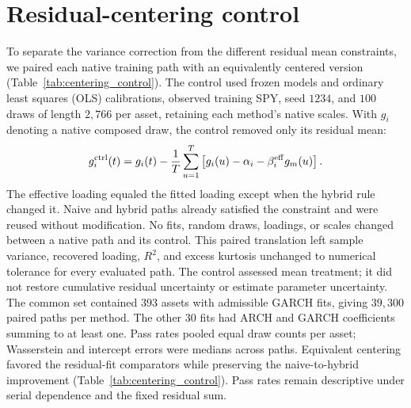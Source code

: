 \begin{table}[H]
  \centering
  \caption{\textbf{Monte Carlo uncertainty in the effect of jump settings
    under corrected composition.} Differences are relative to jumps
    disabled, with $1{,}000$ market replications per window.
    $\Delta$ACF$_{25}$ is the change in mean absolute error of the
    absolute-return autocorrelation function through lag $25$;
    negative values indicate improved temporal fit.
    $\Delta$KS is the change in Kolmogorov--Smirnov non-rejection
    rate in percentage points. Brackets contain approximate $95\%$
    Monte Carlo (MC) intervals conditional on the fitted models and
    observed histories.}
  \label{tab:jump_ablation_uncertainty}
  \footnotesize
  \setlength{\tabcolsep}{4pt}
  
\end{table}

\clearpage
\section{Residual-centering control}
\label{sec:supp-centering-control}

To separate the variance correction from the different residual mean
constraints, we paired each native training path with an equivalently
centered version (Table~\ref{tab:centering_control}). The control used frozen models and ordinary least squares (OLS) calibrations, observed training SPY, seed $1234$, and $100$ draws of length $2{,}766$ per asset, retaining each method's native scales. With $g_i$ denoting a
native composed draw, the control removed only its residual mean:
\begin{equation}
  g_i^{\mathrm{ctrl}}(t)
  = g_i(t)-\frac{1}{T}\sum_{u=1}^{T}
    \left[g_i(u)-\alpha_i-\beta_i^{\mathrm{eff}}g_m(u)\right].
  \label{eq:supp-centering-control}
\end{equation}
The effective loading equaled the fitted loading except when the
hybrid rule changed it. Naive and hybrid paths already satisfied the
constraint and were reused without modification. No fits, random
draws, loadings, or scales changed between a native path and its
control. This paired translation left sample variance, recovered
loading, $R^2$, and excess kurtosis unchanged to numerical tolerance
for every evaluated path. The control assessed mean treatment; it did
not restore cumulative residual uncertainty or estimate parameter
uncertainty.
The common set contained $393$ assets with admissible GARCH fits, giving $39{,}300$ paired paths per method. The other $30$ fits had ARCH and GARCH coefficients summing to at least one. Pass rates pooled equal draw counts per asset; Wasserstein and intercept errors were medians across paths. Equivalent centering favored the residual-fit comparators while preserving the naive-to-hybrid improvement (Table~\ref{tab:centering_control}). Pass rates remain descriptive under serial dependence and the fixed residual sum.

